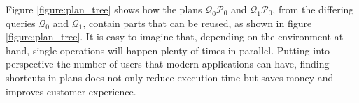  \newpage
 
 Figure \ref{figure:plan_tree} shows how the plans $\mathcal{Q}_0\mathcal{P}_0$ and $\mathcal{Q}_1\mathcal{P}_0$, from the differing queries $\mathcal{Q}_0$ and $\mathcal{Q}_1$, contain parts that can be reused, as shown in figure \ref{figure:plan_tree}. It is easy to imagine that, depending on the environment at hand, single operations will happen plenty of times in parallel. Putting into perspective the number of users that modern applications\cite{uber_technologies_inc_uber_2022} can have, finding shortcuts in plans does not only reduce execution time but saves money and improves customer experience.

\begin{figure}[!h]
    \centering
{} %

\begin{tikzpicture}[x=0.75pt,y=0.75pt,yscale=-1,xscale=1]


\end{tikzpicture}
\end{figure}
